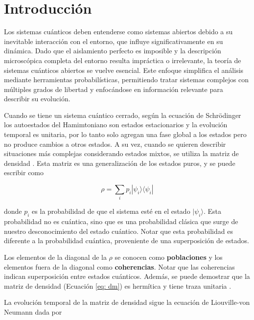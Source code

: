 \section{Introducción}
Los sistemas cuánticos deben entenderse como sistemas abiertos debido a su inevitable interacción con el entorno, que influye significativamente en su dinámica. Dado que el aislamiento perfecto es imposible y la descripción microscópica completa del entorno resulta impráctica o irrelevante, la teoría de sistemas cuánticos abiertos se vuelve esencial. Este enfoque simplifica el análisis mediante herramientas probabilísticas, permitiendo tratar sistemas complejos con múltiples grados de libertad y enfocándose en información relevante para describir su evolución.

Cuando se tiene un sistema cuántico cerrado, según la ecuación de Schrödinger los autoestados del Hamimtoniano son estados estacionarios y la evolución temporal es unitaria, por lo tanto solo agregan una fase global a los estados pero no produce cambios a otros estados. A su vez, cuando se quieren describir situaciones más complejas considerando estados mixtos, se utiliza la matriz de densidad \cite{blum2012density}. Esta matriz es una generalización de los estados puros, y se puede escribir como 

\begin{equation}    \label{eq: dm}
    \rho = \sum_i p_i |\psi_i\rangle \langle \psi_i|
\end{equation} 

\noindent donde \(p_i\) es la probabilidad de que el sistema esté en el estado \(|\psi_i\rangle\). Esta probabilidad no es cuántica, sino que es una probabilidad clásica que surge de nuestro desconocimiento del estado cuántico. Notar que esta probabilidad es diferente a la probabilidad cuántica, proveniente de una superposición de estados.

Los elementos de la diagonal de la \(\rho\) se conocen como \textbf{poblaciones} y los elementos fuera de la diagonal como \textbf{coherencias}. Notar que las coherencias indican superposición entre estados cuánticos. Además, se puede demostrar que la matriz de densidad (Ecuación \ref{eq: dm}) es hermítica y tiene traza unitaria \cite{blum2012density}.


La evolución temporal de la matriz de densidad sigue la ecuación de Liouville-von Neumann dada por \cite{blum2012density,BRE02}

